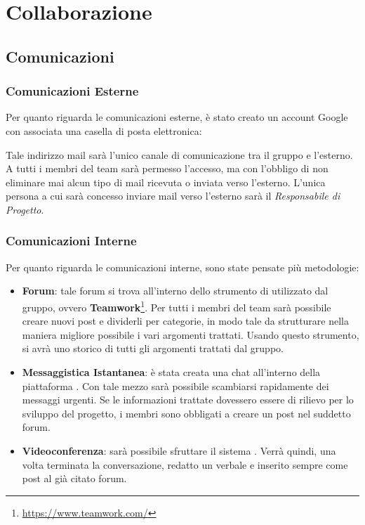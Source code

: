 \section{Collaborazione}
\subsection{Comunicazioni}
\subsubsection{Comunicazioni Esterne}

Per quanto riguarda le comunicazioni esterne, è stato creato un account Google con associata una casella di posta elettronica: 
\begin{center}
\GroupEmail
\end{center}
Tale indirizzo mail sarà l'unico canale di comunicazione tra il gruppo e l'esterno. A tutti i membri del team sarà permesso l'accesso, ma con l'obbligo di non eliminare mai alcun tipo di mail ricevuta o inviata verso l'esterno. L'unica persona a cui sarà concesso inviare mail verso l'esterno sarà il \textit{Responsabile di Progetto}.

\subsubsection{Comunicazioni Interne}

Per quanto riguarda le comunicazioni interne, sono state pensate più metodologie:

\begin{itemize}
\item \textbf{Forum}: tale forum si trova all'interno dello strumento di  utilizzato dal gruppo, ovvero \textbf{Teamwork}\footnote[1]{\url{https://www.teamwork.com/}}. Per tutti i membri del team sarà possibile creare nuovi post e dividerli per categorie, in modo tale da strutturare nella maniera migliore possibile i vari argomenti trattati. Usando questo strumento, si avrà uno storico di tutti gli argomenti trattati dal gruppo.
\item \textbf{Messaggistica Istantanea}: è stata creata una chat all'interno della piattaforma . Con tale mezzo sarà possibile scambiarsi rapidamente dei messaggi urgenti. Se le informazioni trattate dovessero essere di rilievo per lo sviluppo del progetto, i membri sono obbligati a creare un post nel suddetto forum.
\item \textbf{Videoconferenza}: sarà possibile sfruttare il sistema . Verrà quindi, una volta terminata la conversazione, redatto un verbale e inserito sempre come post al già citato forum.
\end{itemize}

